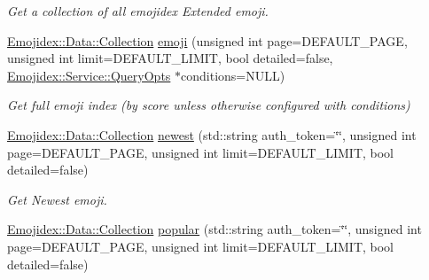 \begin{DoxyCompactItemize}
\begin{DoxyCompactList}\small\item\em Get a collection of all emojidex Extended emoji. \end{DoxyCompactList}\item 
\hyperlink{classEmojidex_1_1Data_1_1Collection}{Emojidex\+::\+Data\+::\+Collection} \hyperlink{classEmojidex_1_1Service_1_1Indexes_ac0aaddbd46779ced7502b6e1f4f81aa9}{emoji} (unsigned int page=D\+E\+F\+A\+U\+L\+T\+\_\+\+P\+A\+GE, unsigned int limit=D\+E\+F\+A\+U\+L\+T\+\_\+\+L\+I\+M\+IT, bool detailed=false, \hyperlink{classEmojidex_1_1Service_1_1QueryOpts}{Emojidex\+::\+Service\+::\+Query\+Opts} $\ast$conditions=N\+U\+LL)\hypertarget{classEmojidex_1_1Service_1_1Indexes_ac0aaddbd46779ced7502b6e1f4f81aa9}{}\label{classEmojidex_1_1Service_1_1Indexes_ac0aaddbd46779ced7502b6e1f4f81aa9}

\begin{DoxyCompactList}\small\item\em Get full emoji index (by score unless otherwise configured with conditions) \end{DoxyCompactList}\item 
\hyperlink{classEmojidex_1_1Data_1_1Collection}{Emojidex\+::\+Data\+::\+Collection} \hyperlink{classEmojidex_1_1Service_1_1Indexes_ab222e1830304388b081413dd0f9bac40}{newest} (std\+::string auth\+\_\+token=\char`\"{}\char`\"{}, unsigned int page=D\+E\+F\+A\+U\+L\+T\+\_\+\+P\+A\+GE, unsigned int limit=D\+E\+F\+A\+U\+L\+T\+\_\+\+L\+I\+M\+IT, bool detailed=false)\hypertarget{classEmojidex_1_1Service_1_1Indexes_ab222e1830304388b081413dd0f9bac40}{}\label{classEmojidex_1_1Service_1_1Indexes_ab222e1830304388b081413dd0f9bac40}

\begin{DoxyCompactList}\small\item\em Get Newest emoji. \end{DoxyCompactList}\item 
\hyperlink{classEmojidex_1_1Data_1_1Collection}{Emojidex\+::\+Data\+::\+Collection} \hyperlink{classEmojidex_1_1Service_1_1Indexes_ae32c731be5ae83b49b428ed7bfd4b2ed}{popular} (std\+::string auth\+\_\+token=\char`\"{}\char`\"{}, unsigned int page=D\+E\+F\+A\+U\+L\+T\+\_\+\+P\+A\+GE, unsigned int limit=D\+E\+F\+A\+U\+L\+T\+\_\+\+L\+I\+M\+IT, bool detailed=false)\hypertarget{classEmojidex_1_1Service_1_1Indexes_ae32c731be5ae83b49b428ed7bfd4b2ed}{}\label{classEmojidex_1_1Service_1_1Indexes_ae32c731be5ae83b49b428ed7bfd4b2ed}


\end{DoxyCompactItemize}
